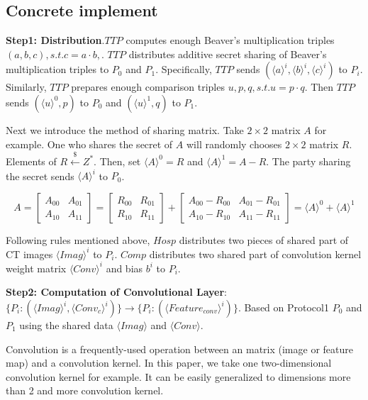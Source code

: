 \documentclass[11pt,twoside,a4paper]{article}
\begin{document}
\subsection{Concrete implement}
\textbf{Step1: Distribution}.$TTP$ computes enough Beaver’s multiplication triples $(a,b,c),s.t.c=a\cdot b,$. 
$TTP$ distributes additive secret sharing of Beaver’s multiplication triples to $P_{0}$ and $P_{1}$. 
Specifically, $TTP$ sends $(\langle a\rangle ^{i}, \langle b\rangle ^{i}, \langle c\rangle ^{i})$ to $P_{i}$.
Similarly, $TTP$ prepares enough comparison triples ${u,p,q}, s.t. u=p\cdot q$. 
Then $TTP$ sends $(\langle u\rangle ^{0}, p)$ to $P_{0}$ and $(\langle u\rangle ^{1}, q)$ to $P_{1}$.

Next we introduce the method of sharing matrix. Take $2\times 2$ matrix $A$ for example. 
One who shares the secret of $A$ will randomly chooses $2\times 2$ matrix $R$. 
Elements of  $R\xleftarrow{\$}Z^{*}$.
Then, set $\langle A\rangle ^{0}=R$ and $\langle A\rangle ^{1}=A-R$.
The party sharing the secret sends $\langle A\rangle ^{i}$ to $P_{0}$.

$$A=\begin{bmatrix}
	A_{00}& A_{01} \\ 
	A_{10}& A_{11}
   \end{bmatrix}= \begin{bmatrix}
	R_{00}& R_{01} \\ 
	R_{10}& R_{11}
   \end{bmatrix}+\begin{bmatrix}
   A_{00}- R_{00}& A_{01}-R_{01} \\ 
   A_{10}- R_{10}& A_{11}-R_{11}
   \end{bmatrix}=\langle A\rangle ^{0}+\langle A\rangle ^{1}$$

Following rules mentioned above, $Hosp$ distributes two pieces of shared part of CT images $\langle Imag\rangle ^{i}$ to $P_{i}$. 
$Comp$ distributes two shared part of convolution kernel weight matrix $\langle Conv\rangle ^{i}$ and bias $b^{i}$ to $P_{i}$.

\textbf{Step2: Computation of Convolutional Layer}:$\{P_{i}:(\langle Imag\rangle ^{i}, \langle Conv_{c}\rangle ^{i})\}\rightarrow \{P_{i}:(\langle Feature_{conv}\rangle ^{i})\}$. 
Based on Protocol1 $P_{0}$ and $P_{1}$ using the shared data $\langle Imag\rangle $ and $\langle Conv\rangle $.

Convolution is a frequently-used operation between an matrix (image or feature map) and a convolution kernel.
In this paper, we take one two-dimensional convolution kernel for example. It can be easily generalized to dimensions more than 2 and more convolution kernel.
\end{document}
